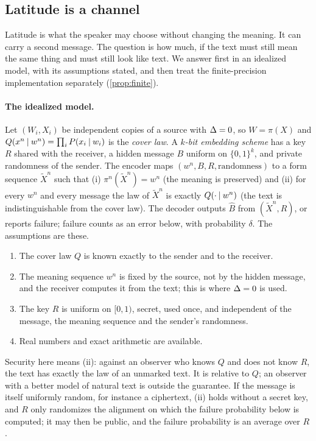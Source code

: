 \subsection{Latitude is a channel}\label{sec:channel}
Latitude is what the speaker may choose without changing the meaning. It can carry a second message. The question is how much, if the text must still mean the same thing and must still look like text. We answer first in an idealized model, with its assumptions stated, and then treat the finite-precision implementation separately (\cref{prop:finite}).

\paragraph{The idealized model.} Let $(W_i,X_i)$ be independent copies of a source with $\Delta=0$, so $W=\pi(X)$ and $Q(x^n\mathbin{\vert} w^n)=\prod_iP(x_i\mathbin{\vert} w_i)$ is the \emph{cover law}. A \emph{$k$-bit embedding scheme} has a key $R$ shared with the receiver, a hidden message $B$ uniform on $\{0,1\}^k$, and private randomness of the sender. The encoder maps $(w^n,B,R,\text{randomness})$ to a form sequence $\tilde X^n$ such that
(i) $\pi^n(\tilde X^n)=w^n$ (the meaning is preserved) and
(ii) for every $w^n$ and every message the law of $\tilde X^n$ is exactly $Q(\cdot\mathbin{\vert} w^n)$ (the text is indistinguishable from the cover law).
The decoder outputs $\hat B$ from $(\tilde X^n,R)$, or reports failure; failure counts as an error below, with probability $\delta$. The assumptions are these.
\begin{enumerate}[label=(A\arabic*)]
\item The cover law $Q$ is known exactly to the sender and to the receiver.
\item The meaning sequence $w^n$ is fixed by the source, not by the hidden message, and the receiver computes it from the text; this is where $\Delta=0$ is used.
\item The key $R$ is uniform on $[0,1)$, secret, used once, and independent of the message, the meaning sequence and the sender's randomness.
\item Real numbers and exact arithmetic are available.
\end{enumerate}
Security here means (ii): against an observer who knows $Q$ and does not know $R$, the text has exactly the law of an unmarked text. It is relative to $Q$; an observer with a better model of natural text is outside the guarantee. If the message is itself uniformly random, for instance a ciphertext, (ii) holds without a secret key, and $R$ only randomizes the alignment on which the failure probability below is computed; it may then be public, and the failure probability is an average over $R$.

